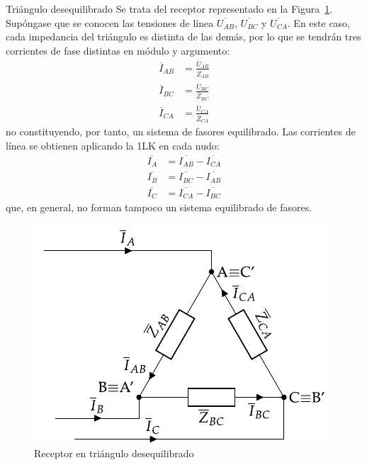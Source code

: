\documentclass[11pt]{book} %
\makeatletter
\numberwithin{dummy}{section}
\theoremstyle{ocrenumbox}
\theoremstyle{blacknumex}
\theoremstyle{blacknumbox}
\theoremstyle{ocrenum}
\renewcommand{\subsubsection}{\@startsection {subsubsection}{3}{\z@}
{-2ex \@plus -0.1ex \@minus -.2ex}
{.2ex \@plus.2ex }
{\normalfont\small\sffamily\bfseries}}
\makeatother
\begin{document}
	\subsubsection{Triángulo desequilibrado}
	Se trata del receptor representado en la Figura~\ref{fig.trianguloDesequilibrado_receptor}. Supóngase que se conocen las tensiones de línea $\overline{U_{AB}}$, $\overline{U_{BC}}$ y $\overline{U_{CA}}$. En este caso, cada impedancia del triángulo es distinta de las demás, por lo que se tendrán tres corrientes de fase distintas en módulo y argumento:
	\begin{align*}
      \overline{I}_{AB} &= \frac{\overline{U}_{AB}}{\overline{Z}_{AB}}\\
      \overline{I}_{BC} &= \frac{\overline{U}_{BC}}{\overline{Z}_{BC}}\\
      \overline{I}_{CA} &= \frac{\overline{U}_{CA}}{\overline{Z}_{CA}}
    \end{align*}
    no constituyendo, por tanto, un sistema de fasores equilibrado. Las corrientes de línea se obtienen aplicando la 1LK en cada nudo:
    \begin{align}
      \overline{I_A} &= \overline{I_{AB}} - \overline{I_{CA}} \\
      \overline{I_B} &= \overline{I_{BC}} - \overline{I_{AB}}\\
      \overline{I_C} &= \overline{I_{CA}} - \overline{I_{BC}}
    \end{align}
    que, en general, no forman tampoco un sistema equilibrado de fasores.
	
	\begin{figure}
	    \centering
	    \includegraphics{../figs/trianguloDesequilibrado_receptor.pdf}
	    \caption{Receptor en triángulo desequilibrado}
	    \label{fig.trianguloDesequilibrado_receptor}
	\end{figure}
	
\end{document}
